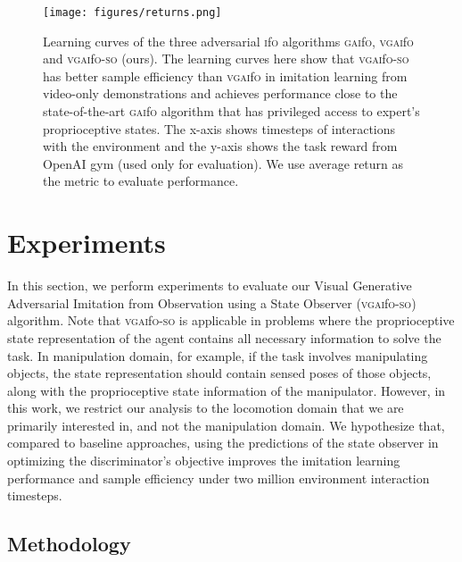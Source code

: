 \documentclass[letterpaper, 10 pt, conference]{ieeeconf}  %
\newcommand{\gaifo}{\textsc{gai}f\textsc{o}}
\newcommand{\ifo}{\textsc{i}f\textsc{o}}
\newcommand{\vgaifo}{\textsc{vgai}f\textsc{o}}
\newcommand{\vgaifoso}{\textsc{vgai}f\textsc{o}-\textsc{so}}
\begin{document}
\begin{figure}[!h]
	\centering
	\texttt{[image: figures/returns.png]}
	\caption{Learning curves of the three adversarial \ifo{} algorithms \gaifo{}, \vgaifo{} and \vgaifoso{} (ours). The learning curves here show that \vgaifoso{} has better sample efficiency than \vgaifo{} in imitation learning from video-only demonstrations and achieves performance close to the state-of-the-art \gaifo{} algorithm that has privileged access to expert's proprioceptive states. The x-axis shows timesteps of interactions with the environment and the y-axis shows the task reward from OpenAI gym \cite{openai} (used only for evaluation). We use average return as the metric to evaluate performance.}
	\label{fig:learningcurves}
\end{figure}




\section{Experiments}
\label{sec:experiments}

In this section, we perform experiments to evaluate our Visual Generative Adversarial Imitation from Observation using a State Observer (\vgaifoso{}) algorithm. Note that \vgaifoso{} is applicable in problems where the proprioceptive state representation of the agent contains all necessary information to solve the task. In manipulation domain, for example, if the task involves manipulating objects, the state representation should contain sensed poses of those objects, along with the proprioceptive state information of the manipulator. However, in this work, we restrict our analysis to the locomotion domain that we are primarily interested in, and not the manipulation domain. We hypothesize that, compared to baseline approaches, using the predictions of the state observer in optimizing the discriminator's objective improves the imitation learning performance and sample efficiency under two million environment interaction timesteps. 

\subsection{Methodology}
\end{document}
